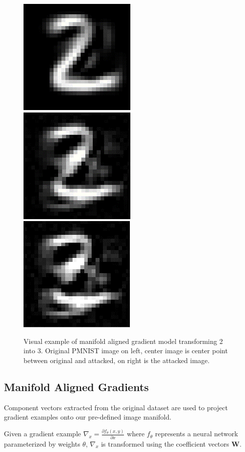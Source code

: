 \begin{figure}[ht]
    \centering
    \includegraphics[width=0.25\linewidth]{c3_figures/pag_0.png}
    \includegraphics[width=0.25\linewidth]{c3_figures/pag_1.png}
    \includegraphics[width=0.25\linewidth]{c3_figures/pag_2.png}
    \caption{Visual example of manifold aligned gradient model transforming 2 into 3. Original PMNIST image on left, center image is center point between original and attacked, on right is the attacked image. }
    \label{fig:perception}
\end{figure}


\subsection{Manifold Aligned Gradients} \label{subsec:ma}

Component vectors extracted from the original dataset are used to project gradient examples onto our pre-defined image manifold.

Given a gradient example $\nabla_x = \frac{\partial f_\theta(x, y)}{\partial x}$ where $f_\theta$ represents a neural network parameterized by weights $\theta$, $\nabla_x$ is transformed using the coefficient vectors \textbf{W}.

